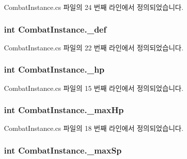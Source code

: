 Combat\+Instance.\+cs 파일의 24 번째 라인에서 정의되었습니다.

\subsubsection[{\texorpdfstring{\+\_\+def}{_def}}]{\setlength{\rightskip}{0pt plus 5cm}int Combat\+Instance.\+\_\+def\hspace{0.3cm}{\ttfamily [private]}}\hypertarget{class_combat_instance_a1c2bc3e91c7e2fee8b5d5f489eaa3d40}{}\label{class_combat_instance_a1c2bc3e91c7e2fee8b5d5f489eaa3d40}


Combat\+Instance.\+cs 파일의 22 번째 라인에서 정의되었습니다.

\subsubsection[{\texorpdfstring{\+\_\+hp}{_hp}}]{\setlength{\rightskip}{0pt plus 5cm}int Combat\+Instance.\+\_\+hp\hspace{0.3cm}{\ttfamily [private]}}\hypertarget{class_combat_instance_a392329b865aa88f2a579fcb7e7a0a99b}{}\label{class_combat_instance_a392329b865aa88f2a579fcb7e7a0a99b}


Combat\+Instance.\+cs 파일의 15 번째 라인에서 정의되었습니다.

\subsubsection[{\texorpdfstring{\+\_\+max\+Hp}{_maxHp}}]{\setlength{\rightskip}{0pt plus 5cm}int Combat\+Instance.\+\_\+max\+Hp\hspace{0.3cm}{\ttfamily [private]}}\hypertarget{class_combat_instance_afce9395cdf3a359fb6eb982c0bf7f063}{}\label{class_combat_instance_afce9395cdf3a359fb6eb982c0bf7f063}


Combat\+Instance.\+cs 파일의 18 번째 라인에서 정의되었습니다.

\subsubsection[{\texorpdfstring{\+\_\+max\+Sp}{_maxSp}}]{\setlength{\rightskip}{0pt plus 5cm}int Combat\+Instance.\+\_\+max\+Sp\hspace{0.3cm}{\ttfamily [private]}}\hypertarget{class_combat_instance_a2489b1182b81f028cfd45f26fb2a7af0}{}\label{class_combat_instance_a2489b1182b81f028cfd45f26fb2a7af0}


